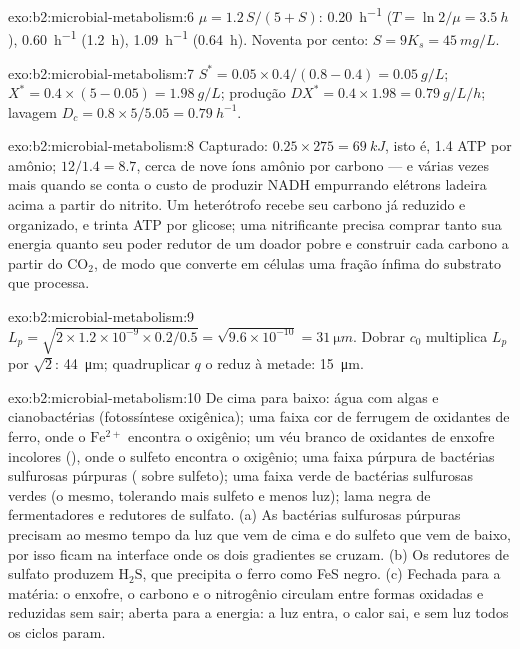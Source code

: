\begin{solution}{exo:b2:microbial-metabolism:6}
$\mu = 1.2\,S/(5 + S)$: \qty{0.20}{h^{-1}} ($T = \ln 2/\mu =
\qty{3.5}{h}$), \qty{0.60}{h^{-1}} (\qty{1.2}{h}), \qty{1.09}{h^{-1}}
(\qty{0.64}{h}). Noventa por cento: $S = 9K_s = \qty{45}{mg/L}$.
\end{solution}

\begin{solution}{exo:b2:microbial-metabolism:7}
$S^* = 0.05\times 0.4/(0.8 - 0.4) = \qty{0.05}{g/L}$; $X^* =
0.4\times(5 - 0.05) = \qty{1.98}{g/L}$; produção $DX^* = 0.4\times
1.98 = \qty{0.79}{g/L/h}$; lavagem $D_c = 0.8\times 5/5.05 =
\qty{0.79}{h^{-1}}$.
\end{solution}

\begin{solution}{exo:b2:microbial-metabolism:8}
Capturado: $0.25\times 275 = \qty{69}{kJ}$, isto é, 1.4 ATP por
amônio; $12/1.4 = 8.7$, cerca de nove íons amônio por carbono --- e
várias vezes mais quando se conta o custo de produzir NADH empurrando
elétrons ladeira acima a partir do nitrito. Um heterótrofo recebe seu
carbono já reduzido e organizado, e trinta ATP por glicose; uma
nitrificante precisa comprar tanto sua energia quanto seu poder
redutor de um doador pobre e construir cada carbono a partir do
$\mathrm{CO_2}$, de modo que converte em células uma fração ínfima do
substrato que processa.
\end{solution}

\begin{solution}{exo:b2:microbial-metabolism:9}
$L_p = \sqrt{2\times 1.2\times 10^{-9}\times 0.2/0.5} =
\sqrt{9.6\times 10^{-10}} = \qty{31}{\micro m}$. Dobrar $c_0$
multiplica $L_p$ por $\sqrt 2$: \qty{44}{\micro m}; quadruplicar $q$
o reduz à metade: \qty{15}{\micro m}.
\end{solution}

\begin{solution}{exo:b2:microbial-metabolism:10}
De cima para baixo: água com algas e cianobactérias (fotossíntese
oxigênica); uma faixa cor de ferrugem de oxidantes de ferro, onde o
$\mathrm{Fe^{2+}}$ encontra o oxigênio; um véu branco de oxidantes de
enxofre incolores (), onde o sulfeto encontra o
oxigênio; uma faixa púrpura de bactérias sulfurosas púrpuras
( sobre sulfeto); uma faixa verde de bactérias
sulfurosas verdes (o mesmo, tolerando mais sulfeto e menos luz); lama
negra de fermentadores e redutores de sulfato.
(a) As bactérias sulfurosas púrpuras precisam ao mesmo tempo da luz
que vem de cima e do sulfeto que vem de baixo, por isso ficam na
interface onde os dois gradientes se cruzam. (b) Os redutores de
sulfato produzem $\mathrm{H_2S}$, que precipita o ferro como FeS
negro. (c) Fechada para a matéria: o enxofre, o carbono e o nitrogênio
circulam entre formas oxidadas e reduzidas sem sair; aberta para a
energia: a luz entra, o calor sai, e sem luz todos os ciclos param.
\end{solution}

